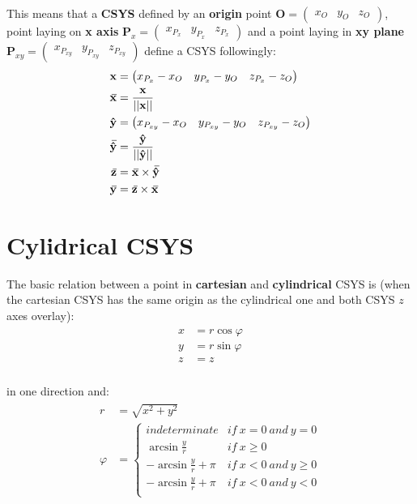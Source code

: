 \documentclass[10pt,b5paper,titlepage]{book}
\newcommand{\m}{\mathbf}
\newcommand{\closure}[2][3]{%
{}\mkern#1mu\overline{\mkern-#1mu#2}}
\newenvironment{eqarray}
{
    \begin{eqnarray}
        \begin{aligned}
}
{
        \end{aligned}
    \end{eqnarray}
}
\begin{document}
This means that a \textbf{CSYS} defined by an \textbf{origin} point
$ \m{O} = \begin{pmatrix} x_O & y_O & z_O \end{pmatrix} $,
point laying on \textbf{x axis}
$ \m{P}_x = \begin{pmatrix} x_{P_x} & y_{P_x} & z_{P_x} \end{pmatrix} $ and a
point laying in \textbf{xy plane}
$ \m{P}_{xy} = \begin{pmatrix} x_{P_{xy}} & y_{P_{xy}} & z_{P_{xy}} \end{pmatrix} $
define a CSYS followingly:
\begin{eqarray}
    \m{x} &= \begin{pmatrix} x_{P_x} - x_O & y_{P_x} - y_O & z_{P_x} - z_O \end{pmatrix} \\
    \m{\closure{x}} &= \frac{\m{x}}{||\m{x}||} \\
    \m{\hat{y}} &= \begin{pmatrix} x_{P_{xy}} - x_O & y_{P_{xy}} - y_O & z_{P_{xy}} - z_O \end{pmatrix} \\
    \m{\closure{\hat{y}}} &= \frac{\m{\hat{y}}}{||\m{\hat{y}}||} \\
    \m{\closure{z}} &= \m{\closure{x}} \times \m{\closure{\hat{y}}} \\
    \m{\closure{y}} &= \m{\closure{z}} \times \m{\closure{x}} \\
\end{eqarray}


\newpage
\section{Cylidrical CSYS}

The basic relation between a point in \textbf{cartesian} and \textbf{cylindrical}
CSYS is (when the cartesian CSYS has the same origin as the cylindrical one
and both CSYS $ z $ axes overlay):
\begin{eqarray}
    x &= r \cos \varphi \\
    y &= r \sin \varphi \\
    z &= z \\
\end{eqarray}

 in one direction and:
 \begin{eqarray}
     r &= \sqrt{x^2 + y^2} \\
     \varphi &= \left\{ \begin{array}{cc}
                indeterminate & if\ x = 0\ and\ y = 0 \\
                \arcsin \frac{y}{r} & if\ x \ge 0 \\
                -\arcsin \frac{y}{r} + \pi & if\ x < 0\ and\ y \ge 0 \\
                -\arcsin \frac{y}{r} + \pi & if\ x < 0\ and\ y < 0 \\
             \end{array} \right.
 \end{eqarray}
\end{document}
